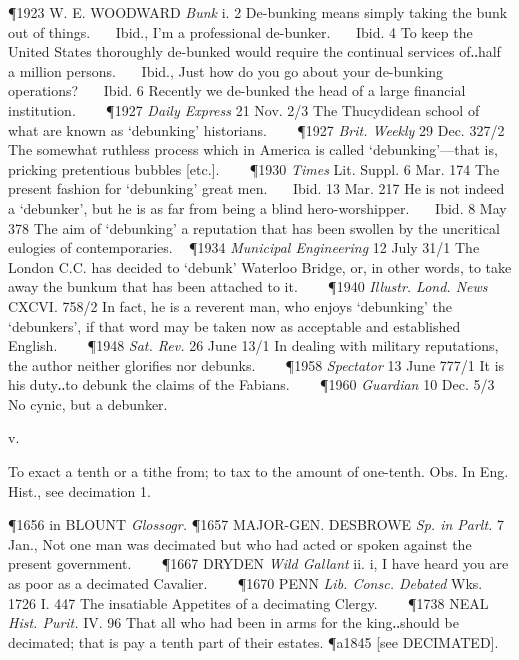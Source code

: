 \begin{description}[wide, labelwidth=!, labelindent=0pt]
\P 1923 W. E. WOODWARD  \textit{Bunk} i. 2 De-bunking means simply taking the bunk out of things.    Ibid., I'm a professional de-bunker.    Ibid. 4 To keep the United States thoroughly de-bunked would require the continual services of‥half a million persons.    Ibid., Just how do you go about your de-bunking operations?    Ibid. 6 Recently we de-bunked the head of a large financial institution.    
\P 1927  \textit{Daily Express} 21 Nov. 2/3 The Thucydidean school of what are known as ‘debunking’ historians.    
\P 1927  \textit{Brit. Weekly} 29 Dec. 327/2 The somewhat ruthless process which in America is called ‘debunking’—that is, pricking pretentious bubbles [etc.].    
\P 1930  \textit{Times} Lit. Suppl. 6 Mar. 174 The present fashion for ‘debunking’ great men.    Ibid. 13 Mar. 217 He is not indeed a ‘debunker’, but he is as far from being a blind hero-worshipper.    Ibid. 8 May 378 The aim of ‘debunking’ a reputation that has been swollen by the uncritical eulogies of contemporaries.  
\P 1934 \textit{Municipal  Engineering} 12 July 31/1 The London C.C. has decided to ‘debunk’ Waterloo Bridge, or, in other words, to take away the bunkum that has been attached to it.    
\P 1940  \textit{Illustr. Lond. News} CXCVI. 758/2 In fact, he is a reverent man, who enjoys ‘debunking’ the ‘debunkers’, if that word may be taken now as acceptable and established English.    
\P 1948  \textit{Sat. Rev.} 26 June 13/1 In dealing with military reputations, the author neither glorifies nor debunks.    
\P 1958  \textit{Spectator} 13 June 777/1 It is his duty‥to debunk the claims of the Fabians.    
\P 1960  \textit{Guardian} 10 Dec. 5/3 No cynic, but a debunker.



 v.

\noindent {}

\vspace{-0.3cm}

\begin{myenumerate}

 To exact a tenth or a tithe from; to tax to the amount of one-tenth. Obs. In Eng. Hist., see decimation 1.

\P 1656 in  BLOUNT \textit{Glossogr.}
\P 1657 MAJOR-GEN. DESBROWE  \textit{Sp. in Parlt.} 7 Jan., Not one man was decimated but who had acted or spoken against the present government.    
\P 1667 DRYDEN  \textit{Wild Gallant} ii. i, I have heard you are as poor as a decimated Cavalier.    
\P 1670 PENN  \textit{Lib. Consc. Debated} Wks. 1726 I. 447  The insatiable Appetites of a decimating Clergy.    
\P 1738 NEAL  \textit{Hist. Purit.} IV. 96 That all who had been in arms for the king‥should be decimated; that is pay a tenth part of their estates.
\P a1845 [see DECIMATED].


\end{myenumerate}
\end{description}
